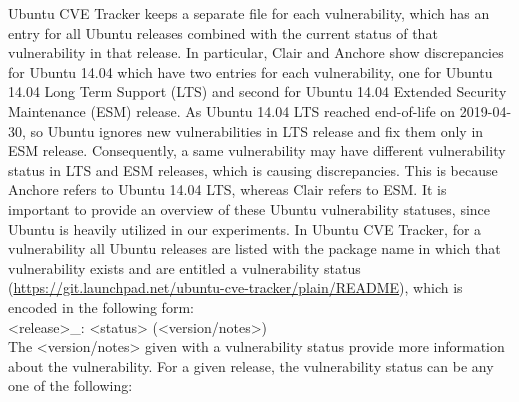 \documentclass[a4paper,num-refs]{oup-contemporary}
\begin{document}
{Ubuntu CVE Tracker keeps a separate file for each vulnerability, which
has an entry for all Ubuntu releases combined with the current status
of that vulnerability in that release.
In particular, Clair and Anchore show discrepancies for Ubuntu 14.04 which have
two entries for each vulnerability, one for Ubuntu 14.04 Long Term Support (LTS)
and second for Ubuntu 14.04 Extended Security Maintenance (ESM) release. As Ubuntu 14.04 LTS
reached end-of-life on 2019-04-30, so Ubuntu ignores new vulnerabilities in LTS release and
fix them only in ESM release. Consequently, a same vulnerability may have different vulnerability status in LTS and ESM releases,
which is causing discrepancies. This is because Anchore refers to Ubuntu 14.04 LTS, whereas Clair refers to
ESM.
It is important to provide an overview of these Ubuntu vulnerability statuses, 
since Ubuntu is heavily utilized in our experiments. 
%
%
In Ubuntu CVE Tracker, for a vulnerability all Ubuntu releases are listed with the package name
in which that vulnerability exists and are entitled a vulnerability status
(\url{https://git.launchpad.net/ubuntu-cve-tracker/plain/README}), which is
encoded in the following form:
\newline \\
\noindent <release>\_<source-package>: <status> (<version/notes>)
\newline\\
The <version/notes> given with a vulnerability status provide more
information about the vulnerability.
For a given release, the vulnerability status can be any one of the following:

}
\end{document}
